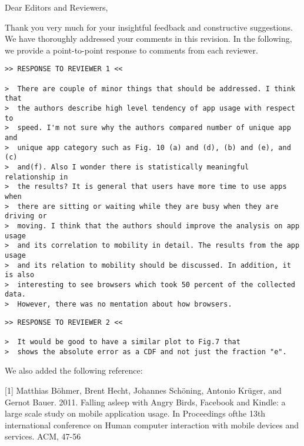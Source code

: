 \noindent Dear Editors and Reviewers,
\bigskip

Thank you very much for your insightful feedback and constructive suggestions. We have thoroughly addressed your comments %
in this revision. %
In the following, we provide a point-to-point response to comments from each reviewer.

\bigskip
\begin{verbatim}
>> RESPONSE TO REVIEWER 1 <<

>  There are couple of minor things that should be addressed. I think that
>  the authors describe high level tendency of app usage with respect to
>  speed. I'm not sure why the authors compared number of unique app and
>  unique app category such as Fig. 10 (a) and (d), (b) and (e), and (c)
>  and(f). Also I wonder there is statistically meaningful relationship in
>  the results? It is general that users have more time to use apps when
>  there are sitting or waiting while they are busy when they are driving or
>  moving. I think that the authors should improve the analysis on app usage
>  and its correlation to mobility in detail. The results from the app usage
>  and its relation to mobility should be discussed. In addition, it is also
>  interesting to see browsers which took 50 percent of the collected data.
>  However, there was no mentation about how browsers.
\end{verbatim}


\bigskip
\begin{verbatim}
>> RESPONSE TO REVIEWER 2 <<

>  It would be good to have a similar plot to Fig.7 that
>  shows the absolute error as a CDF and not just the fraction "e".
\end{verbatim}


\bigskip
We also added the following reference:

[1]  Matthias Böhmer, Brent Hecht, Johannes Schöning, Antonio Krüger, and Gernot Bauer. 2011. Falling asleep with Angry Birds, Facebook and Kindle: a large scale study on mobile application usage. In Proceedings ofthe 13th international conference on Human computer interaction with mobile devices and services. ACM, 47-56
